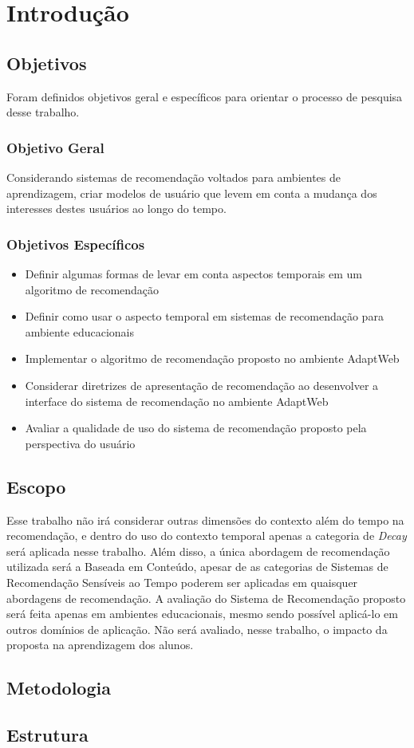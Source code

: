 \chapter{Introdução}\label{introducao}

\section{Objetivos}

Foram definidos objetivos geral e específicos para orientar o processo de pesquisa desse trabalho.

\subsection{Objetivo Geral}

Considerando sistemas de recomendação voltados para ambientes de aprendizagem, criar modelos de usuário que levem em
conta a mudança dos interesses destes usuários ao longo do tempo.

\subsection{Objetivos Específicos}

\begin{itemize}
\item Definir algumas formas de levar em conta aspectos temporais em um algoritmo de recomendação
\item Definir como usar o aspecto temporal em sistemas de recomendação para ambiente educacionais
\item Implementar o algoritmo de recomendação proposto no ambiente AdaptWeb\textsuperscript{\textregistered}
\item Considerar diretrizes de apresentação de recomendação ao desenvolver a interface do sistema de recomendação
no ambiente AdaptWeb\textsuperscript{\textregistered}
\item Avaliar a qualidade de uso do sistema de recomendação proposto pela perspectiva do usuário
\end{itemize}

\section{Escopo}

Esse trabalho não irá considerar outras dimensões do contexto além do tempo na recomendação, e dentro do uso do contexto
temporal apenas a categoria de \textit{Decay} será aplicada nesse trabalho. Além disso, a única abordagem de recomendação
utilizada será a Baseada em Conteúdo, apesar de as categorias de Sistemas de Recomendação Sensíveis ao Tempo poderem ser
aplicadas em quaisquer abordagens de recomendação. A avaliação do Sistema de Recomendação proposto será feita apenas em ambientes educacionais, mesmo sendo
possível aplicá-lo em outros domínios de aplicação. Não será avaliado, nesse trabalho, o impacto da proposta na aprendizagem
dos alunos.

\section{Metodologia}

\section{Estrutura}




